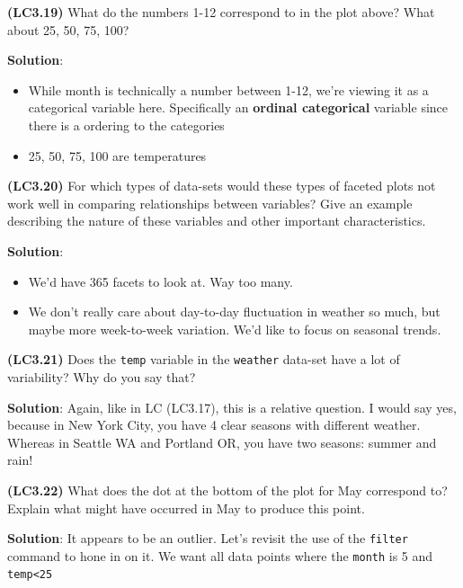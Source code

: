 \documentclass[12pt, krantz2,]{krantz}
\makeatletter
\newenvironment{Shaded}{\begin{snugshade}}{\end{snugshade}}
\newcommand{\DecValTok}[1]{\textcolor[rgb]{0.06,0.06,0.06}{#1}}
\newcommand{\KeywordTok}[1]{\textcolor[rgb]{0.27,0.27,0.27}{\textbf{#1}}}
\newcommand{\NormalTok}[1]{#1}
\newcommand{\OperatorTok}[1]{\textcolor[rgb]{0.43,0.43,0.43}{\textbf{#1}}}
\newcommand{\StringTok}[1]{\textcolor[rgb]{0.5,0.5,0.5}{#1}}
\providecommand{\tightlist}{%
  \setlength{\itemsep}{0pt}\setlength{\parskip}{0pt}}
\newenvironment{kframe}{%
\medskip{}
\setlength{\fboxsep}{.8em}
 \def\at@end@of@kframe{}%
 \ifinner\ifhmode%
  \def\at@end@of@kframe{\end{minipage}}%
  \begin{minipage}{\columnwidth}%
 \fi\fi%
 \def\FrameCommand##1{\hskip\@totalleftmargin \hskip-\fboxsep
 \colorbox{shadecolor}{##1}\hskip-\fboxsep
     \hskip-\linewidth \hskip-\@totalleftmargin \hskip\columnwidth}%
 \MakeFramed {\advance\hsize-\width
   \@totalleftmargin\z@ \linewidth\hsize
   \@setminipage}}%
 {\par\unskip\endMakeFramed%
 \at@end@of@kframe}
\renewenvironment{Shaded}{\begin{kframe}}{\end{kframe}}
\makeatother
\begin{document}
\textbf{(LC3.19)} What do the numbers 1-12 correspond to in the plot above? What about 25, 50, 75, 100?

\textbf{Solution}:

\begin{itemize}
\tightlist
\item
  While month is technically a number between 1-12, we're viewing it as a categorical variable here. Specifically an \textbf{ordinal categorical} variable since there is a ordering to the categories
\item
  25, 50, 75, 100 are temperatures
\end{itemize}

\textbf{(LC3.20)} For which types of data-sets would these types of faceted plots not work well in comparing relationships between variables? Give an example describing the nature of these variables and other important characteristics.

\textbf{Solution}:

\begin{itemize}
\tightlist
\item
  We'd have 365 facets to look at. Way too many.
\item
  We don't really care about day-to-day fluctuation in weather so much, but maybe more week-to-week variation. We'd like to focus on seasonal trends.
\end{itemize}

\textbf{(LC3.21)} Does the \texttt{temp} variable in the \texttt{weather} data-set have a lot of variability? Why do you say that?

\textbf{Solution}: Again, like in LC (LC3.17), this is a relative question. I would say yes, because in New York City, you have 4 clear seasons with different weather. Whereas in Seattle WA and Portland OR, you have two seasons: summer and rain!

\textbf{(LC3.22)} What does the dot at the bottom of the plot for May correspond to? Explain what might have occurred in May to produce this point.

\textbf{Solution}: It appears to be an outlier. Let's revisit the use of the \texttt{filter} command to hone in on it. We want all data points where the \texttt{month} is 5 and \texttt{temp\textless{}25}

\begin{Shaded}
\end{Shaded}
\end{document}
